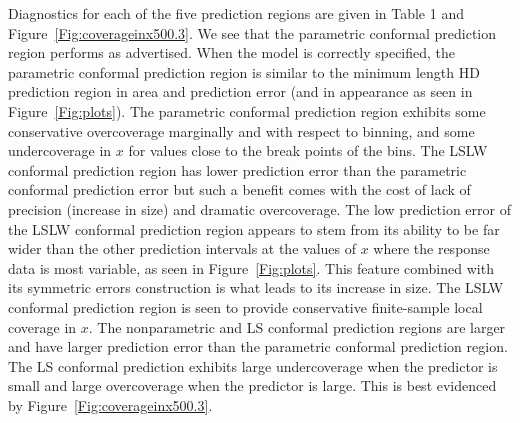 \documentclass[11pt]{article}\usepackage[]{graphicx}\usepackage[]{color}
\begin{document}
Diagnostics for each of the five prediction regions are given in Table 1 and 
Figure~\ref{Fig:coverageinx500.3}.  We see that the parametric 
conformal prediction region performs as advertised.  When the model is 
correctly specified, the parametric conformal prediction region is similar to 
the minimum length HD prediction region in area and prediction error (and in 
appearance as seen in Figure~\ref{Fig:plots}).  The parametric conformal 
prediction region exhibits some conservative overcoverage marginally and with 
respect to binning, and some undercoverage in $x$ for values close to the 
break points of the bins.  The LSLW conformal prediction region has lower 
prediction error than the parametric conformal prediction error but such a 
benefit comes with the cost of lack of precision (increase in size) and 
dramatic overcoverage.  The low prediction error of the LSLW conformal 
prediction region appears to stem from its ability to be far wider than 
the other prediction intervals at the values of $x$ where the response data 
is most variable, as seen in Figure~\ref{Fig:plots}.  This feature combined 
with its symmetric errors construction is what leads to its increase in size.  
The LSLW conformal prediction region is seen to provide conservative 
finite-sample local coverage in $x$.
The nonparametric and LS conformal prediction regions are larger and have 
larger prediction error than the parametric conformal prediction region.  
The LS conformal prediction exhibits large undercoverage when the predictor 
is small and large overcoverage when the predictor is large.  This is best 
evidenced by Figure~\ref{Fig:coverageinx500.3}.
\end{document}
